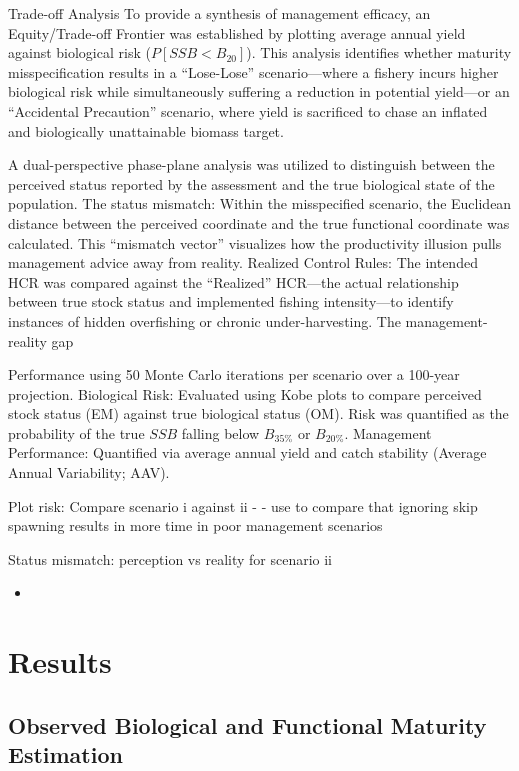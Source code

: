 \documentclass[
  authoryear,
  preprint,
  3p]{elsarticle}
\providecommand{\tightlist}{%
  \setlength{\itemsep}{0pt}\setlength{\parskip}{0pt}}
\begin{document}
Trade-off Analysis To provide a synthesis of management efficacy, an
Equity/Trade-off Frontier was established by plotting average annual
yield against biological risk (\(P[SSB < B_{20}]\)). This analysis
identifies whether maturity misspecification results in a ``Lose-Lose''
scenario---where a fishery incurs higher biological risk while
simultaneously suffering a reduction in potential yield---or an
``Accidental Precaution'' scenario, where yield is sacrificed to chase
an inflated and biologically unattainable biomass target.

A dual-perspective phase-plane analysis was utilized to distinguish
between the perceived status reported by the assessment and the true
biological state of the population. The status mismatch: Within the
misspecified scenario, the Euclidean distance between the perceived
coordinate and the true functional coordinate was calculated. This
``mismatch vector'' visualizes how the productivity illusion pulls
management advice away from reality. Realized Control Rules: The
intended HCR was compared against the ``Realized'' HCR---the actual
relationship between true stock status and implemented fishing
intensity---to identify instances of hidden overfishing or chronic
under-harvesting. The management-reality gap

Performance using 50 Monte Carlo iterations per scenario over a 100-year
projection. Biological Risk: Evaluated using Kobe plots to compare
perceived stock status (EM) against true biological status (OM). Risk
was quantified as the probability of the true \(SSB\) falling below
\(B_{35\%}\) or \(B_{20\%}\). Management Performance: Quantified via
average annual yield and catch stability (Average Annual Variability;
AAV).

Plot risk: Compare scenario i against ii - - use to compare that
ignoring skip spawning results in more time in poor management scenarios

Status mismatch: perception vs reality for scenario ii

\begin{itemize}
\tightlist
\item
\end{itemize}

\section{Results}\label{results}

\subsection{Observed Biological and Functional Maturity
Estimation}\label{observed-biological-and-functional-maturity-estimation}
\end{document}
